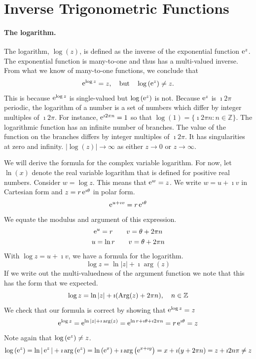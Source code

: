 \section{Inverse Trigonometric Functions}



\paragraph{The logarithm.}
The logarithm, $\log(z)$, is defined as the inverse of the exponential 
function $\mathop{\mathrm{e}}\nolimits^z$.  The exponential function is many-to-one and thus 
has a multi-valued inverse.  From what we know of many-to-one functions, we 
conclude that 
\[
\mathop{\mathrm{e}}\nolimits^{\log z} = z, \quad \mathrm{but} \quad \log \left( \mathop{\mathrm{e}}\nolimits^z \right) \neq z.
\]
This is because $\mathop{\mathrm{e}}\nolimits^{\log z}$ is single-valued but $\log \left( \mathop{\mathrm{e}}\nolimits^z \right)$ is not.
Because $\mathop{\mathrm{e}}\nolimits^z$ is $\imath 2 \pi$ periodic, the logarithm of a number is 
a set of numbers which differ by integer multiples of $\imath 2 \pi$.  For 
instance, $\mathop{\mathrm{e}}\nolimits^{\imath 2 \pi n} = 1$ so that 
$\log(1) = \{ \imath 2 \pi n : n \in \mathbb{Z} \}$.
The logarithmic function has an infinite number of branches.  The value of 
the function on the branches differs by integer multiples of $\imath 2 \pi$.  It has 
singularities at zero and infinity.  $|\log(z)| \to \infty$ as either
$z \to 0$ or $z \to \infty$.  

We will derive the formula for the complex variable logarithm.
For now, let $\ln(x)$ denote the real variable logarithm that is defined
for positive real numbers.   Consider $w = \log z$.  This means that
$\mathop{\mathrm{e}}\nolimits^w = z$.   We write $w = u + \imath v$ in Cartesian form and 
$z = r \mathop{\mathrm{e}}\nolimits^{\imath \theta}$ in polar form.
\[
\mathop{\mathrm{e}}\nolimits^{u + \imath v} = r \mathop{\mathrm{e}}\nolimits^{\imath \theta}
\]
We equate the modulus and argument of this expression.
\begin{gather*}
  \mathop{\mathrm{e}}\nolimits^u = r \qquad v = \theta + 2 \pi n 
  \\
  u = \ln r \qquad v = \theta + 2 \pi n 
\end{gather*}
With $\log z = u + \imath v$, we have a formula for the logarithm.
\[
\boxed{
  \log z = \ln |z| + \imath \arg(z)
  }
\]
If we write out the multi-valuedness of the argument function we note 
that this has the form that we expected.
\[
\log z = \ln |z| + \imath ( \mathop{\mathrm{Arg}}\nolimits(z) + 2 \pi n ), \quad n \in \mathbb{Z}
\]
We check that our formula is correct by showing that $\mathop{\mathrm{e}}\nolimits^{\log z} = z$
\[
\mathop{\mathrm{e}}\nolimits^{\log z} = \mathop{\mathrm{e}}\nolimits^{\ln |z| + \imath \arg(z)}
= \mathop{\mathrm{e}}\nolimits^{\ln r + \imath \theta + \imath 2 \pi n}
= r \mathop{\mathrm{e}}\nolimits^{\imath \theta}
= z
\]
Note again that $\log \left( \mathop{\mathrm{e}}\nolimits^z \right) \neq z$.
\[
\log \left( \mathop{\mathrm{e}}\nolimits^z \right) = \ln |\mathop{\mathrm{e}}\nolimits^z| + \imath \arg \left( \mathop{\mathrm{e}}\nolimits^z \right)
= \ln \left( \mathop{\mathrm{e}}\nolimits^x \right) + \imath \arg \left( \mathop{\mathrm{e}}\nolimits^{x + \imath y} \right)
= x + \imath (y + 2 \pi n)
= z + \imath 2 n \pi 
\neq z
\]

